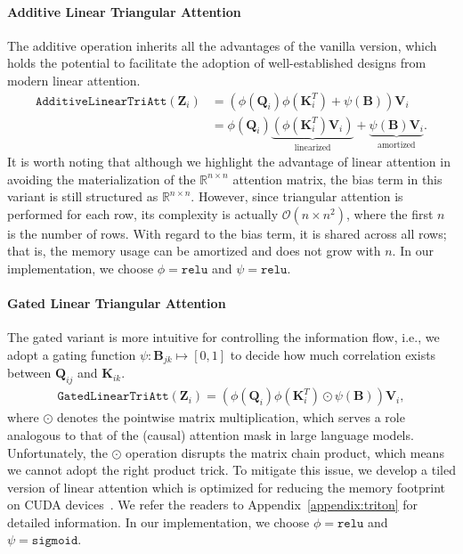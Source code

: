 \documentclass[]{bytedance_seed}
\begin{document}
\paragraph{Additive Linear Triangular Attention} The additive operation inherits all the advantages of the vanilla version, which holds the potential to facilitate the adoption of well-established designs from modern linear attention. 
\begin{align}
    \mathtt{AdditiveLinearTriAtt}(\mathbf{Z}_i) & = \left(\phi(\mathbf{Q}_i)\phi(\mathbf{K}_i^T)+\psi(\mathbf{B})\right)\mathbf{V}_i \\
    & = \phi(\mathbf{Q}_i)\underbrace{\left(\phi(\mathbf{K}_i^T)\mathbf{V}_i\right)}_{\text{linearized}} +\underbrace{\psi(\mathbf{B})\mathbf{V}_i}_{\text{amortized}}.
\end{align}
It is worth noting that although we highlight the advantage of linear attention in avoiding the materialization of the $\mathbb{R}^{n\times n}$ attention matrix, the bias term in this variant is still structured as $\mathbb{R}^{n\times n}$. However, since triangular attention is performed for each row, its complexity is actually $\mathcal{O}(n\times n^2)$, where the first $n$ is the number of rows. With regard to the bias term, it is shared across all rows; that is, the memory usage can be amortized and does not grow with $n$. In our implementation, we choose $\phi=\mathtt{relu}$ and $\psi=\mathtt{relu}$.

\paragraph{Gated Linear Triangular Attention} The gated variant is more intuitive for controlling the information flow, i.e., we adopt a gating function $\psi:\mathbf{B}_{jk}\mapsto[0,1]$ to decide how much correlation exists between $\mathbf{Q}_{ij}$ and $\mathbf{K}_{ik}$.
\begin{align}
    \mathtt{GatedLinearTriAtt}(\mathbf{Z}_i) = \left(\phi(\mathbf{Q}_i)\phi(\mathbf{K}_i^T)\odot\psi(\mathbf{B})\right)\mathbf{V}_i, 
\end{align}
where $\odot$ denotes the pointwise matrix multiplication, which serves a role analogous to that of the (causal) attention mask in large language models. Unfortunately, the $\odot$ operation disrupts the matrix chain product, which means we cannot adopt the right product trick. To mitigate this issue, we develop a tiled version of linear attention which is optimized for reducing the memory footprint on CUDA devices~\cite{dao2022flashattentionfastmemoryefficientexact,Atkinson2025latkins,Geiger2025NVIDIA}. We refer the readers to Appendix~\ref{appendix:triton} for detailed information. In our implementation, we choose $\phi=\mathtt{relu}$ and $\psi=\mathtt{sigmoid}$.
\end{document}
